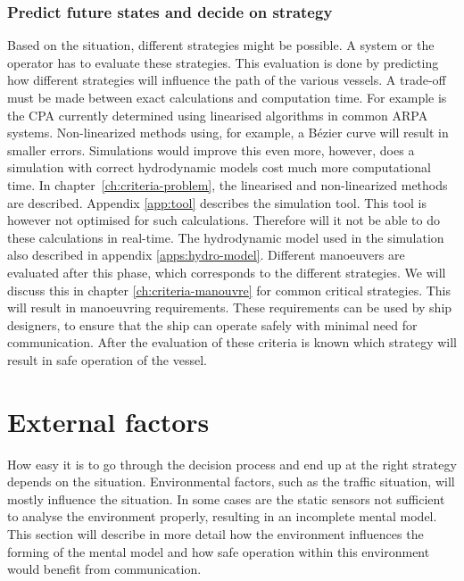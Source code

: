 \subsubsection{Predict future states and decide on strategy}
Based on the situation, different strategies might be possible. A system or the operator has to evaluate these strategies. This evaluation is done by predicting how different strategies will influence the path of the various vessels. A trade-off must be made between exact calculations and computation time. For example is the \acf{CPA} currently determined using linearised algorithms in common \ac{ARPA} systems. Non-linearized methods using, for example, a Bézier curve will result in smaller errors. Simulations would improve this even more, however, does a simulation with correct hydrodynamic models cost much more computational time. In chapter~\ref{ch:criteria-problem}, the linearised and non-linearized methods are described. Appendix \ref{app:tool} describes the simulation tool. This tool is however not optimised for such calculations. Therefore will it not be able to do these calculations in real-time. The hydrodynamic model used in the simulation also described in appendix \ref{apps:hydro-model}. Different manoeuvers are evaluated after this phase, which corresponds to the different strategies. We will discuss this in chapter \ref{ch:criteria-manouvre} for common critical strategies. This will result in manoeuvring requirements. These requirements can be used by ship designers, to ensure that the ship can operate safely with minimal need for communication.
After the evaluation of these criteria is known which strategy will result in safe operation of the vessel.

\newpage
\section{External factors}
How easy it is to go through the decision process and end up at the right strategy depends on the situation. Environmental factors, such as the traffic situation, will mostly influence the situation. In some cases are the static sensors not sufficient to analyse the environment properly, resulting in an incomplete mental model. This section will describe in more detail how the environment influences the forming of the mental model and how safe operation within this environment would benefit from communication. 

